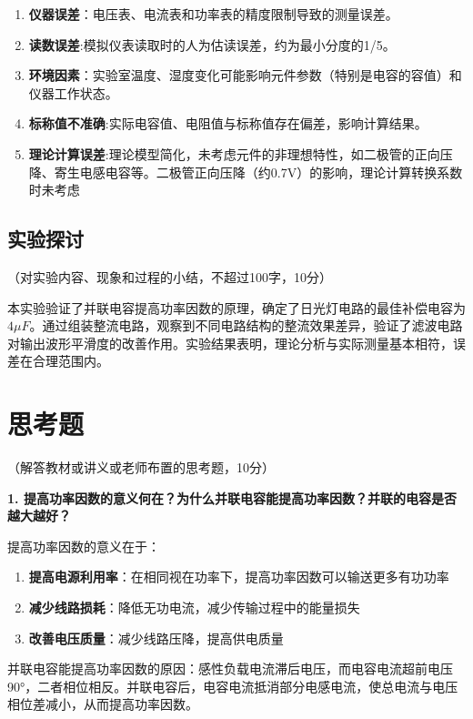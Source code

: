 \documentclass[10pt,a4paper]{ctexart}
\newcommand{\myspace}[1]{\par\vspace{#1\baselineskip}} %
\newcommand{\xiaosi}{\fontsize{12pt}{16pt}\selectfont}
\begin{document}
    \begin{enumerate}
        \item \textbf{仪器误差}：电压表、电流表和功率表的精度限制导致的测量误差。
        \item \textbf{读数误差}:模拟仪表读取时的人为估读误差，约为最小分度的1/5。
        \item \textbf{环境因素}：实验室温度、湿度变化可能影响元件参数（特别是电容的容值）和仪器工作状态。
        \item \textbf{标称值不准确}:实际电容值、电阻值与标称值存在偏差，影响计算结果。
        \item \textbf{理论计算误差}:理论模型简化，未考虑元件的非理想特性，如二极管的正向压降、寄生电感电容等。二极管正向压降（约0.7V）的影响，理论计算转换系数时未考虑
    \end{enumerate}
    \myspace{1}
    \subsection{实验探讨}
    \xiaosi （对实验内容、现象和过程的小结，不超过100字，10分）
    
    本实验验证了并联电容提高功率因数的原理，确定了日光灯电路的最佳补偿电容为$4\mu F$。通过组装整流电路，观察到不同电路结构的整流效果差异，验证了滤波电路对输出波形平滑度的改善作用。实验结果表明，理论分析与实际测量基本相符，误差在合理范围内。

\section{思考题}

    \xiaosi （解答教材或讲义或老师布置的思考题，10分）
    
    \textbf{1. 提高功率因数的意义何在？为什么并联电容能提高功率因数？并联的电容是否越大越好？}
    
    提高功率因数的意义在于：
    \begin{enumerate}
        \item \textbf{提高电源利用率}：在相同视在功率下，提高功率因数可以输送更多有功功率
        \item \textbf{减少线路损耗}：降低无功电流，减少传输过程中的能量损失
        \item \textbf{改善电压质量}：减少线路压降，提高供电质量
    \end{enumerate}
    
    并联电容能提高功率因数的原因：感性负载电流滞后电压，而电容电流超前电压90°，二者相位相反。并联电容后，电容电流抵消部分电感电流，使总电流与电压相位差减小，从而提高功率因数。
    
\end{document}
